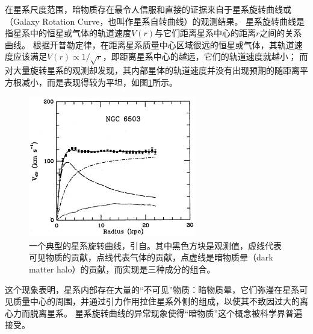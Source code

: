 在星系尺度范围，暗物质存在最令人信服和直接的证据来自于星系旋转曲线或（Galaxy Rotation Curve，也叫作星系自转曲线）的观测结果。
星系旋转曲线是指星系中的恒星或气体的轨道速度$V(r)$与它们距离星系中心的距离$r$之间的关系曲线。
根据开普勒定律，在距离星系质量中心区域很远的恒星或气体，其轨道速度应该满足$V(r)\propto 1/\sqrt{r}$，即距离星系中心的越远，它们的轨道速度就越小；
而对大量旋转星系的观测\parencite{rubin1980rotational}却发现，其内部星体的轨道速度并没有出现预期的随距离平方根减小，而是表现得较为平坦，如图\ref{fig:introduction:rotation_curve}所示。
\begin{figure}[htbp]
	\centering
	\includegraphics[width=0.65\textwidth]{chap/introduction/fig/rotation_curve.png}
	\caption{一个典型的星系旋转曲线，引自\parencite{begeman_extended_1991}。其中黑色方块是观测值，虚线代表可见物质的贡献，点线代表气体的贡献，点虚线是暗物质晕（dark matter halo）的贡献，而实现是三种成分的组合。}
	\label{fig:introduction:rotation_curve}
\end{figure}
这个现象表明，星系内部存在大量的“不可见”物质：暗物质晕，它们弥漫在星系可见质量中心的周围，并通过引力作用拉住星系外侧的组成，以使其不致因过大的离心力而脱离星系\parencite{bosma1978distribution}。
星系旋转曲线的异常现象使得“暗物质”这个概念被科学界普遍接受。

